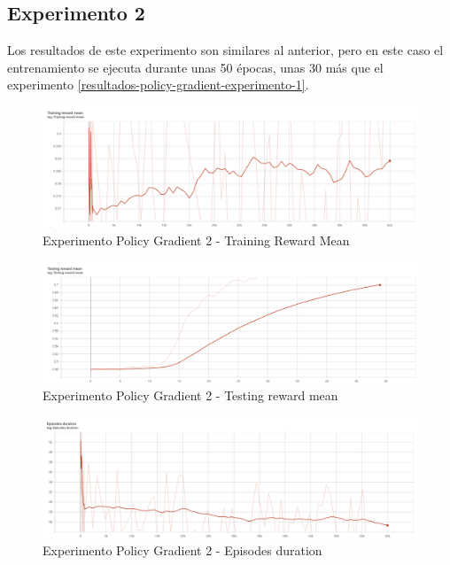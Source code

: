 \subsection{Experimento 2}
\label{resultados-policy-gradient-experimento-2}

Los resultados de este experimento son similares al anterior, pero en este caso el entrenamiento se ejecuta durante unas 50 épocas, unas 30 más que el experimento \ref{resultados-policy-gradient-experimento-1}.

\begin{figure}[H]
	\centering
	\includegraphics[width=1\textwidth]{figuras/experiments/policy_gradient/policy_gradient_normalized_image_reward_50_epochs/training_reward_mean.png}
	\caption[Experimento Policy Gradient 2 - Training Reward Mean]{Experimento Policy Gradient 2 - Training Reward Mean}
	\label{fig-experimento-policy-gradient-2-training-reward-mean}
\end{figure}
\begin{figure}[H]
	\centering
	\includegraphics[width=1\textwidth]{figuras/experiments/policy_gradient/policy_gradient_normalized_image_reward_50_epochs/testing_reward_mean.png}
	\caption[Experimento Policy Gradient 2 - Testing reward mean]{Experimento Policy Gradient 2 - Testing reward mean}
	\label{fig-experimento-policy-gradient-2-testing-reward-mean}
\end{figure}
\begin{figure}[H]
	\centering
	\includegraphics[width=1\textwidth]{figuras/experiments/policy_gradient/policy_gradient_normalized_image_reward_50_epochs/episodes_duration.png}
	\caption[Experimento Policy Gradient 2 - Episodes duration]{Experimento Policy Gradient 2 - Episodes duration}
	\label{fig-experimento-policy-gradient-2-episodes-duration}
\end{figure}

